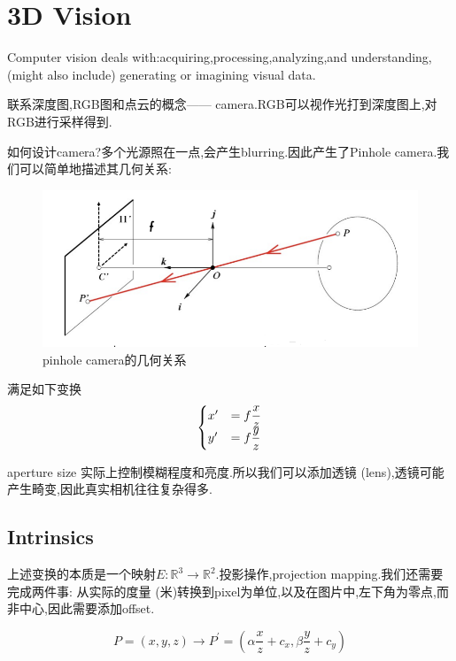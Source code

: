 \chapter{3D Vision}

Computer vision deals with:acquiring,processing,analyzing,and understanding,(might also include) 
generating or imagining visual data.

联系深度图,RGB图和点云的概念------ camera.RGB可以视作光打到深度图上,对RGB进行采样得到.

如何设计camera?多个光源照在一点,会产生blurring.因此产生了Pinhole camera.我们可以简单地描述其几何关系:
\begin{figure}[htbp]
	\centering
	\includegraphics[scale=0.65]{figures/pinholecamera.png}
	\caption{pinhole camera的几何关系}
\end{figure}

满足如下变换
\begin{equation}
	\begin{cases}
		x^\prime &= f\displaystyle\frac{x}{z}
		\\
		y^\prime &= f\displaystyle\frac{y}{z}
	\end{cases}
\end{equation}

aperture size 实际上控制模糊程度和亮度.所以我们可以添加透镜 (lens),透镜可能产生畸变,因此真实相机往往复杂得多.

\section{Intrinsics}

上述变换的本质是一个映射$E: \mathbb{R}^3 \to \mathbb R^2$.投影操作,projection mapping.我们还需要完成两件事:
从实际的度量 (米)转换到pixel为单位,以及在图片中,左下角为零点,而非中心,因此需要添加offset.

\begin{equation}
	P=(x, y, z) \rightarrow P^{\prime}=\left(\alpha \frac{x}{z}+c_{x}, \beta \frac{y}{z}+c_{y}\right)
\end{equation}

